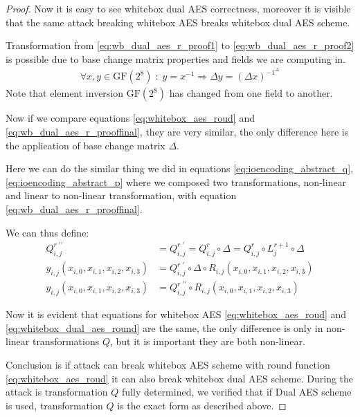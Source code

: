 \documentclass[11pt,oneside,final]{fithesis2}
\newcommand{\gfe}{\ensuremath{\text{GF}\left(2^8\right)}}
\begin{document}
\begin{proof}
	Now it is easy to see whitebox dual AES correctness, moreover it is visible that the same attack breaking whitebox AES breaks whitebox dual AES scheme. 

	Transformation from \ref{eq:wb_dual_aes_r_proof1} to \ref{eq:wb_dual_aes_r_proof2} is possible due to base change matrix properties and fields we are computing in.
	\begin{align}
	    \forall x,y \in \gfe \; : \; y = x^{-1} \Rightarrow  \Delta y = \left( \Delta x \right)^{-1^{\Delta}}
	\end{align}
	Note that element inversion $\gfe$ has changed from one field to another.

	Now if we compare equations \ref{eq:whitebox_aes_roud} and \ref{eq:wb_dual_aes_r_prooffinal}, they are very similar, 
	the only difference here is the application of base change matrix $\Delta$.

	Here we can do the similar thing we did in equations \ref{eq:ioencoding_abstract_q}, \ref{eq:ioencoding_abstract_p} where we composed
	two transformations, non-linear and linear to non-linear transformation, with equation \ref{eq:wb_dual_aes_r_prooffinal}. 

	We can thus define:
	\begin{subequations}
	\begin{align}
	    Q^{r \; \prime\prime}_{i,j} &= Q^{r \; \prime}_{i,j} = Q^{r}_{i,j} \circ \Delta = Q^{r}_{i,j} \circ L^{r+1}_{j} \circ \Delta \\
	    y_{i,j}\left(x_{i,0}, x_{i,1}, x_{i,2}, x_{i,3}\right) &= Q^{r \; \prime}_{i,j}       \circ \Delta \circ R_{i,j}\left(x_{i,0}, x_{i,1}, x_{i,2}, x_{i,3}\right) \\
	    y_{i,j}\left(x_{i,0}, x_{i,1}, x_{i,2}, x_{i,3}\right) &= Q^{r \; \prime\prime}_{i,j} \circ R_{i,j}\left(x_{i,0}, x_{i,1}, x_{i,2}, x_{i,3}\right) \label{eq:whitebox_dual_aes_round}
	\end{align}
	\end{subequations}

	Now it is evident that equations for whitebox AES \ref{eq:whitebox_aes_roud} and \ref{eq:whitebox_dual_aes_round} are the same, the only difference is only in non-linear 
	transformations $Q$, but it is important they are both non-linear. 

	Conclusion is if attack can break whitebox AES scheme with round function \ref{eq:whitebox_aes_roud} it can also break whitebox dual AES scheme. During the attack is transformation $Q$ 
	fully determined, we verified that if Dual AES scheme is used, transformation $Q$ is the exact form as described above.
	\end{proof}
\end{document}
